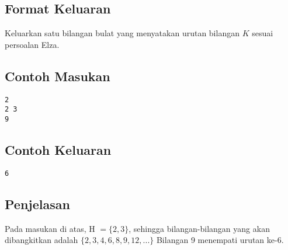 \documentclass{article}
\begin{document}
\subsection*{Format Keluaran}

Keluarkan satu bilangan bulat yang menyatakan urutan bilangan $K$ sesuai persoalan Elza.
\\

\begin{multicols}{2}
\subsection*{Contoh Masukan}
\begin{lstlisting}
2
2 3
9
\end{lstlisting}
\columnbreak
\subsection*{Contoh Keluaran}
\begin{lstlisting}
6
\end{lstlisting}
\vfill
\null
\end{multicols}


\subsection*{Penjelasan}
Pada masukan di atas, H $ = \{2, 3\}$, sehingga bilangan-bilangan yang akan dibangkitkan adalah 
$\{2, 3, 4, 6, 8, 9, 12, ... \}$
Bilangan 9 menempati urutan ke-6.

\pagebreak
\end{document}
